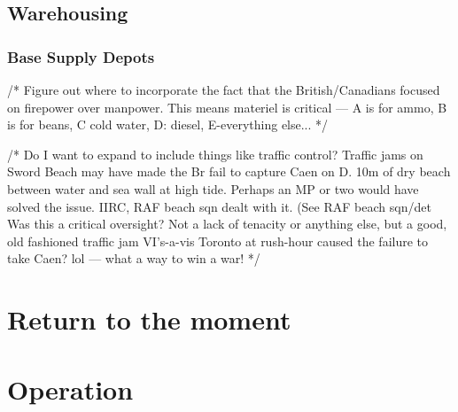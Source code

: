 \documentclass[noraggedright]{turabian-researchpaper}
\begin{document}
	\subsection{Warehousing}



		\subsubsection{Base Supply Depots}
	

/* Figure out where to incorporate the fact that the British/Canadians focused
on firepower over manpower.  This means materiel is critical --- A is for ammo,
B is for beans, C cold water, D: diesel, E-everything else... */

/* Do I want to expand to include things like traffic control?  Traffic jams
on Sword Beach may have made the Br fail to capture Caen on D.  10m of dry
beach between water and sea wall at high tide.  Perhaps an MP or two would
have solved the issue. IIRC, RAF beach sqn dealt with it. (See
RAF beach sqn/det  Was this a critical
oversight?  Not a lack of tenacity or anything else, but a good, old fashioned
traffic jam VI's-a-vis Toronto at rush-hour caused the failure to take Caen?
lol --- what a way to win a war! */

\section{Return to the moment} 

\section{Operation } %
\end{document}

